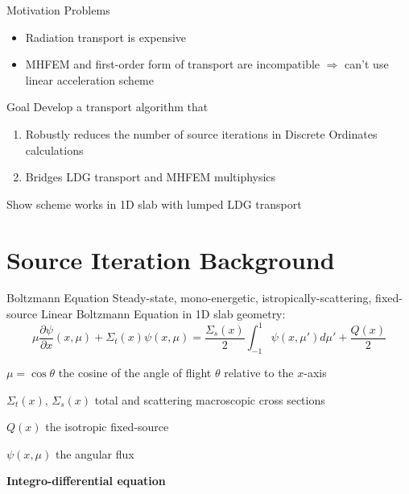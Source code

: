 \documentclass[10pt]{beamer}
\newcommand{\ud}{\mathop{}\!\mathrm{d}} %
\newcommand{\pderiv}[2]{\frac{\partial #1}{\partial #2}}
\begin{document}
\begin{frame}{Motivation}
    Problems
    \vspace{-.05in}
    	\begin{itemize}
    		\item Radiation transport is expensive 
    		\item MHFEM and first-order form of transport are incompatible $\Rightarrow$ can't use linear acceleration scheme 
    	\end{itemize}

    \begin{block}{Goal}
        Develop a transport algorithm that 
            \begin{enumerate} \vspace{-.05in}
                \item Robustly reduces the number of source iterations in Discrete Ordinates calculations 
                \item Bridges LDG transport and MHFEM multiphysics
            \end{enumerate}
        \vspace{-.05in}
       	Show scheme works in 1D slab with lumped LDG transport
    \end{block}

\end{frame}

\section{Source Iteration Background}

\begin{frame}{Boltzmann Equation}
    Steady-state, mono-energetic, istropically-scattering, fixed-source \alert{Linear Boltzmann Equation} in 1D slab geometry:
    \begin{equation*}
        \mu \pderiv{\psi}{x}(x, \mu) + \Sigma_t(x) \psi(x,\mu) = 
        \frac{\Sigma_s(x)}{2} \int_{-1}^{1} \psi(x, \mu') d\mu' + \frac{Q(x)}{2}
    \end{equation*}

    $\mu = \cos \theta$ the cosine of the angle of flight $\theta$ relative to the $x$-axis

    $\Sigma_t(x)$, $\Sigma_s(x)$ total and scattering macroscopic cross sections 

    $Q(x)$ the isotropic fixed-source

    $\psi(x,\mu)$ the angular flux 


    \vfill
    \centerline{\textbf{Integro-differential equation}}

\end{frame}
\end{document}
